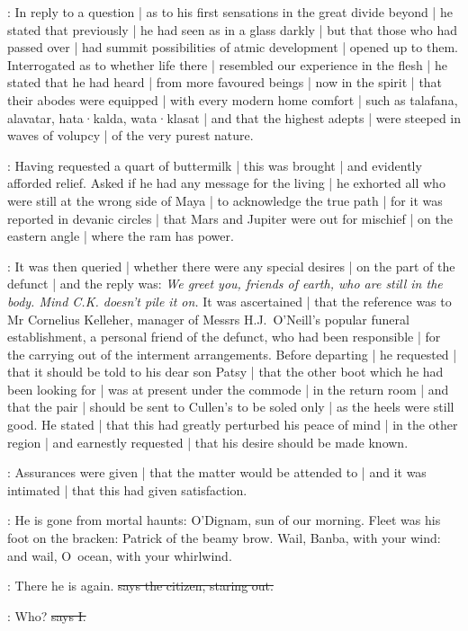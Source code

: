 :
In reply to a question |
as to his first sensations in the great divide beyond |
he stated that previously |
he had seen as in a glass darkly |
but that those who had passed over
 |
had summit possibilities of atmic development |
opened up to them.
Interrogated as to whether life there |
resembled our experience in the flesh |
he stated that he had heard |
from more favoured beings |
now in the spirit |
that their abodes were equipped |
with every modern home comfort |
such as talafana,
alavatar,
hata·kalda,
wata·klasat |
and that the highest adepts |
were steeped in waves of volupcy |
of the very purest nature.

:
Having requested a quart of buttermilk |
this was brought |
and evidently afforded relief.
Asked if he had any message for the living |
he exhorted all who were still at the wrong side of Maya |
to acknowledge the true path |
for it was reported in devanic circles |
that Mars and Jupiter were out for mischief |
on the eastern angle |
where the ram has power.%

:
It was then queried |
whether there were any special desires |
on the part of the defunct |
and the reply was:
\emph{We greet you,
friends of earth,
who are still in the body.
Mind C.K. doesn't pile it on.}
It was ascertained |
that the reference was to Mr Cornelius Kelleher,
manager of Messrs H.J.~O'Neill's popular funeral establishment,
a personal friend of the defunct,
who had been responsible |
for the carrying out of the interment arrangements.
Before departing |
he requested |
that it should be told to his dear son Patsy |
that the other boot which he had been looking for |
was at present under the commode |
in the return room |
and that the pair |
should be sent to Cullen's to be soled only |
as the heels were still good.%
He stated |
that this had greatly perturbed his peace of mind |
in the other region |
and earnestly requested |
that his desire should be made known.

:
Assurances were given |
that the matter would be attended to |
and it was intimated |
that this had given satisfaction.

:
He is gone from mortal haunts:
O'Dignam,
sun of our morning.
Fleet was his foot on the bracken:
Patrick of the beamy brow.
Wail,
Banba,
with your wind:
and wail,
O~ocean,
with your whirlwind.

\citizen:
There he is again.
\sout{says the citizen,
staring out.}

:
Who?
\sout{says I.}

